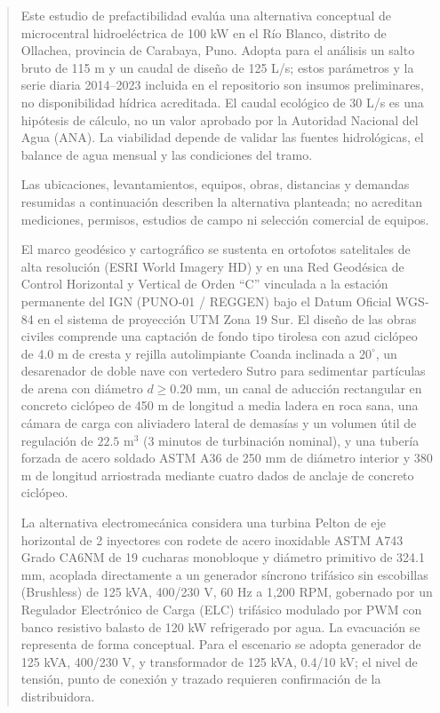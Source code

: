 \documentclass[11pt,a4paper]{report}
\begin{document}
\begin{abstract}
\noindent Este estudio de prefactibilidad evalúa una alternativa conceptual de microcentral hidroeléctrica de 100 kW en el Río Blanco, distrito de Ollachea, provincia de Carabaya, Puno. Adopta para el análisis un salto bruto de 115 m y un caudal de diseño de 125 L/s; estos parámetros y la serie diaria 2014--2023 incluida en el repositorio son insumos preliminares, no disponibilidad hídrica acreditada. El caudal ecológico de 30 L/s es una hipótesis de cálculo, no un valor aprobado por la Autoridad Nacional del Agua (ANA). La viabilidad depende de validar las fuentes hidrológicas, el balance de agua mensual y las condiciones del tramo.

Las ubicaciones, levantamientos, equipos, obras, distancias y demandas resumidas a continuación describen la alternativa planteada; no acreditan mediciones, permisos, estudios de campo ni selección comercial de equipos.

El marco geodésico y cartográfico se sustenta en ortofotos satelitales de alta resolución (ESRI World Imagery HD) y en una Red Geodésica de Control Horizontal y Vertical de Orden ``C'' vinculada a la estación permanente del IGN (PUNO-01 / REGGEN) bajo el Datum Oficial WGS-84 en el sistema de proyección UTM Zona 19 Sur. El diseño de las obras civiles comprende una captación de fondo tipo tirolesa con azud ciclópeo de 4.0 m de cresta y rejilla autolimpiante Coanda inclinada a $20^\circ$, un desarenador de doble nave con vertedero Sutro para sedimentar partículas de arena con diámetro $d \ge 0.20\text{ mm}$, un canal de aducción rectangular en concreto ciclópeo de 450 m de longitud a media ladera en roca sana, una cámara de carga con aliviadero lateral de demasías y un volumen útil de regulación de $22.5\text{ m}^3$ (3 minutos de turbinación nominal), y una tubería forzada de acero soldado ASTM A36 de 250 mm de diámetro interior y 380 m de longitud arriostrada mediante cuatro dados de anclaje de concreto ciclópeo. 

La alternativa electromecánica considera una turbina Pelton de eje horizontal de 2 inyectores con rodete de acero inoxidable ASTM A743 Grado CA6NM de 19 cucharas monobloque y diámetro primitivo de 324.1 mm, acoplada directamente a un generador síncrono trifásico sin escobillas (Brushless) de 125 kVA, 400/230 V, 60 Hz a 1,200 RPM, gobernado por un Regulador Electrónico de Carga (ELC) trifásico modulado por PWM con banco resistivo balasto de 120 kW refrigerado por agua. La evacuación se representa de forma conceptual. Para el escenario se adopta generador de 125 kVA, 400/230 V, y transformador de 125 kVA, 0.4/10 kV; el nivel de tensión, punto de conexión y trazado requieren confirmación de la distribuidora.


\end{abstract}
\end{document}
